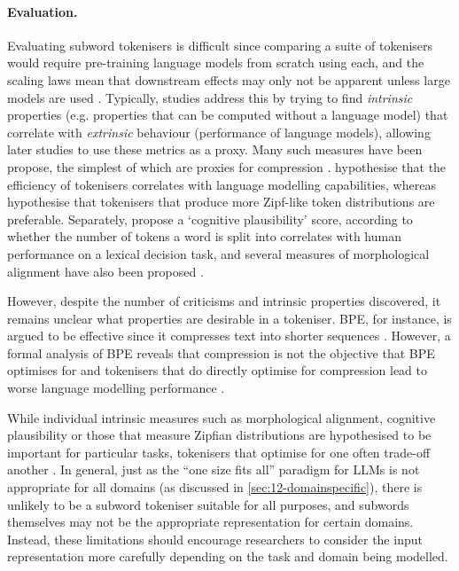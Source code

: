 \paragraph{Evaluation.} Evaluating subword tokenisers is difficult since comparing a suite of tokenisers would require pre-training language models from scratch using each, and the scaling laws mean that downstream effects may only not be apparent unless large models are used \citep{wei2022emergent}. Typically, studies address this by trying to find \emph{intrinsic} properties (e.g. properties that can be computed without a language model) that correlate with \emph{extrinsic} behaviour (performance of language models), allowing later studies to use these metrics as a proxy. Many such measures have been propose, the simplest of which are proxies for compression \citep[e.g. fertility,][]{acs2019exploring}. \citet{zouhar-etal-2023-tokenization} hypothesise that the \renyi efficiency of tokenisers correlates with language modelling capabilities, whereas \citet{lotz2025beyond} hypothesise that tokenisers that produce more Zipf-like token distributions are preferable. Separately, \citet{beinborn-pinter-2023-analyzing} propose a `cognitive plausibility' score, according to whether the number of tokens a word is split into correlates with human performance on a lexical decision task, and several measures of morphological alignment have also been proposed \citep{gow-smith-etal-2022-improving, batsuren2024evaluating, arnett2025language}.

However, despite the number of criticisms and intrinsic properties discovered, it remains unclear what properties are desirable in a tokeniser. BPE, for instance, is argued to be effective since it compresses text into shorter sequences \citep{galle2019investigating}. However, a formal analysis of BPE reveals that compression is not the objective that BPE optimises for \citep{zouhar2023formal} and tokenisers that do directly optimise for compression lead to worse language modelling performance \citep{schmidt2024tokenization}. 

While individual intrinsic measures such as morphological alignment, cognitive plausibility or those that measure Zipfian distributions are hypothesised to be important for particular tasks, tokenisers that optimise for one often trade-off another \citep{uzan-etal-2024-greed, lotz2025beyond}. In general, just as the ``one size fits all'' paradigm for LLMs is not appropriate for all domains (as discussed in \cref{sec:12-domainspecific}), there is unlikely to be a subword tokeniser suitable for all purposes, and subwords themselves may not be the appropriate representation for certain domains. Instead, these limitations should encourage researchers to consider the input representation more carefully depending on the task and domain being modelled.

